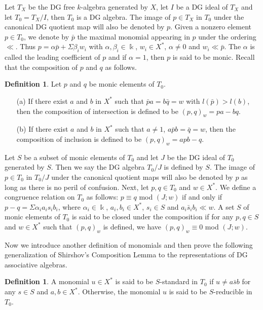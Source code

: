 \documentclass[a4paper,10pt]{amsart}
\theoremstyle{definition}
\newtheorem{defn}[theorem]{Definition}
\theoremstyle{remark}
\numberwithin{equation}{section}
\begin{document}
Let $T_X$ be the DG free $k$-algebra generated by $X$, let $I$ be a
DG ideal of $T_X$ and let $T_0=T_X/I$, then $T_0$ is a DG algebra.
The image of $p\in T_X$ in $T_0$ under the canonical DG quotient map
will also be denoted by $p$. Given a nonzero element $p\in T_0$, we
denote by $\bar{p}$ the maximal monomial appearing in $p$ under the
ordering $\ll$. Thus $p=\alpha\bar{p}+\Sigma \beta_iw_i$ with
$\alpha, \beta_i\in \Bbbk$, $w_i\in X^*$, $\alpha\neq 0$ and $w_i\ll
\bar{p}$. The $\alpha$ is called the leading coefficient of $p$ and if
$\alpha=1$, then $p$ is said to be monic. Recall that the
composition of $p$ and $q$ as follows.
\begin{defn} \cite{KL}
Let $p$ and $q$ be monic elements of $T_0$.
\begin{enumerate}
  \item[(a)]If there exist $a$ and $b$ in $X^*$ such that
$\bar{p}a=b\bar{q}=w$ with $l(\bar{p})>l(b)$, then the composition
of intersection is defined to be $(p, q)_w=pa-bq$.
  \item[(b)]If there exist $a$ and $b$ in $X^*$ such that $a\neq 1$,
$a\bar{p}b=\bar{q}=w$, then the composition of inclusion is defined
to be $(p, q)_w=apb-q$.
\end{enumerate}
\end{defn}
Let $S$ be a subset of monic elements of $T_0$ and let $J$ be the DG
ideal of $T_0$ generated by $S$. Then we say the DG algebra $T_0/J$
is defined by $S$. The image of $p\in T_0$ in $T_0/J$ under the
canonical quotient maps will also be denoted by $p$ as long as there
is no peril of confusion. Next, let $p, q\in T_0$ and $w\in X^*$. We
define a congruence relation on $T_0$ as follows: $p\equiv q$ mod
$(J; w)$ if and only if $p-q=\Sigma\alpha_ia_is_ib_i$, where
$\alpha_i\in \Bbbk$, $a_i, b_i\in X^*$, $s_i\in S$ and $a_i\bar{s}_ib_i\ll w$. A set $S$ of monic elements of $T_0$ is said
to be closed under the composition if for any $p, q\in S$ and $w\in
X^*$ such that $(p, q)_w$ is defined, we have $(p, q)_w\equiv 0$ mod
$(J; w)$.

Now we introduce another definition of monomials and then prove the
following generalization of Shirshov's Composition Lemma to the
representations of DG associative algebras.
\begin{defn} \cite{KL}
 A monomial $u\in X^*$ is said to be $S$-standard in $T_0$ if $u\neq
a\bar{s}b$ for any $s\in S$ and $a, b\in X^*$. Otherwise, the
monomial $u$ is said to be $S$-reducible in $T_0$.
\end{defn}
\end{document}
